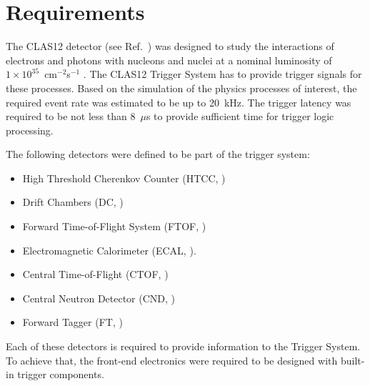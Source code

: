\section{Requirements}

The CLAS12 detector (see Ref.~\cite{overview-ref}) was designed to study the interactions of electrons and photons with nucleons and nuclei at a nominal luminosity of $1\times 10^{35}$~cm$^{-2}$s$^{-1}$ \cite{clas12-nim}. The CLAS12 Trigger System has to provide trigger signals for these processes. Based on the simulation of the physics processes of interest, the required event rate was estimated to be up to 20~kHz. The trigger latency was required to be not less than 8~$\mu$s to provide sufficient time for trigger logic processing.


The following detectors were defined to be part of the trigger system:

\begin{itemize}
	\item High Threshold Cherenkov Counter (HTCC, \cite{htcc-ref})
	\item Drift Chambers (DC, \cite{dc-ref})
	\item Forward Time-of-Flight System (FTOF, \cite{ftof-ref})
	\item Electromagnetic Calorimeter (ECAL, \cite{ec-ref}).
	\item Central Time-of-Flight (CTOF, \cite{ctof-ref})
	\item Central Neutron Detector (CND, \cite{cnd-ref})
	\item Forward Tagger (FT, \cite{ft-ref})
\end{itemize}

Each of these detectors is required to provide information to the Trigger System. To achieve that, the front-end electronics were required to be designed with built-in trigger components. 

 
